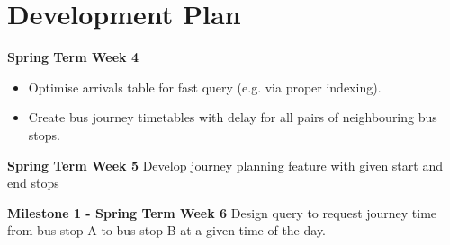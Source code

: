 \section{Development Plan}
\begin{description}
	\item \textbf{Spring Term Week 4} 
    \begin{itemize}
    	\item Optimise arrivals table for fast query (e.g. via proper indexing).
		\item Create bus journey timetables with delay for all pairs of neighbouring bus stops.
    \end{itemize}
    \item \textbf{Spring Term Week 5}
    Develop journey planning feature with given start and end stops
    \item \textbf{Milestone 1 - Spring Term Week 6} 
    Design query to request journey time from bus stop A to bus stop B at a given time of the day.


\end{description}
